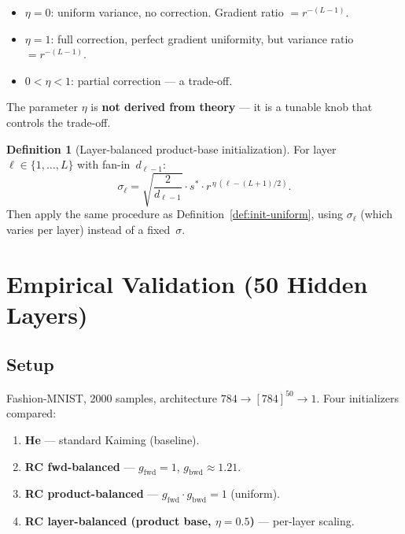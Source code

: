 \documentclass[11pt,a4paper]{article}
\theoremstyle{definition}
\newtheorem{definition}[theorem]{Definition}
\begin{document}
\begin{itemize}[nosep]
  \item $\eta = 0$: uniform variance, no correction.  Gradient ratio $= r^{-(L-1)}$.
  \item $\eta = 1$: full correction, perfect gradient uniformity, but variance ratio $= r^{-(L-1)}$.
  \item $0 < \eta < 1$: partial correction --- a trade-off.
\end{itemize}

The parameter $\eta$ is \textbf{not derived from theory} --- it is a tunable
knob that controls the trade-off.

\begin{definition}[Layer-balanced product-base initialization]
\label{def:init-layerbal}
For layer~$\ell \in \{1,\ldots,L\}$ with fan-in~$d_{\ell-1}$:
\begin{equation}\label{eq:target-std}
  \sigma_\ell = \sqrt{\frac{2}{d_{\ell-1}}} \cdot s^{\ast} \cdot r^{\,\eta\,(\ell - (L+1)/2)}.
\end{equation}
Then apply the same procedure as Definition~\ref{def:init-uniform},
using $\sigma_\ell$ (which varies per layer) instead of a fixed~$\sigma$.
\end{definition}


\section{Empirical Validation (50 Hidden Layers)}
\label{sec:empirical}

\subsection{Setup}
Fashion-MNIST, 2000 samples, architecture $784 \to [784]^{50} \to 1$.
Four initializers compared:
\begin{enumerate}[nosep]
  \item \textbf{He} --- standard Kaiming (baseline).
  \item \textbf{RC fwd-balanced} --- $g_{\mathrm{fwd}} = 1$, $g_{\mathrm{bwd}} \approx 1.21$.
  \item \textbf{RC product-balanced} --- $g_{\mathrm{fwd}} \cdot g_{\mathrm{bwd}} = 1$ (uniform).
  \item \textbf{RC layer-balanced (product base, $\eta = 0.5$)} --- per-layer scaling.
\end{enumerate}
\end{document}
